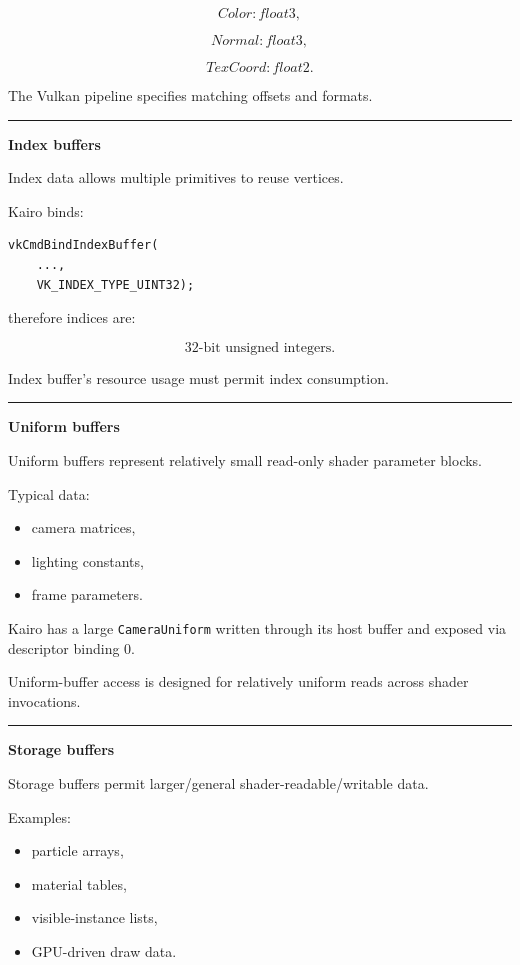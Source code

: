 \[
Color:float3,
\]

\[
Normal:float3,
\]

\[
TexCoord:float2.
\]

The Vulkan pipeline specifies matching offsets and formats.

\begin{center}\rule{0.5\linewidth}{0.5pt}\end{center}

\textbf{Index buffers}

Index data allows multiple primitives to reuse vertices.

Kairo binds:

\begin{verbatim}
vkCmdBindIndexBuffer(
    ...,
    VK_INDEX_TYPE_UINT32);
\end{verbatim}

therefore indices are:

\[
32\text{-bit unsigned integers}.
\]

Index buffer's resource usage must permit index consumption.

\begin{center}\rule{0.5\linewidth}{0.5pt}\end{center}

\textbf{Uniform buffers}

Uniform buffers represent relatively small read-only shader parameter blocks.

Typical data:

\begin{itemize}
\tightlist
\item
  camera matrices,
\item
  lighting constants,
\item
  frame parameters.
\end{itemize}

Kairo has a large \texttt{CameraUniform} written through its host buffer and exposed via descriptor binding 0.

Uniform-buffer access is designed for relatively uniform reads across shader invocations.

\begin{center}\rule{0.5\linewidth}{0.5pt}\end{center}

\textbf{Storage buffers}

Storage buffers permit larger/general shader-readable/writable data.

Examples:

\begin{itemize}
\tightlist
\item
  particle arrays,
\item
  material tables,
\item
  visible-instance lists,
\item
  GPU-driven draw data.
\end{itemize}

